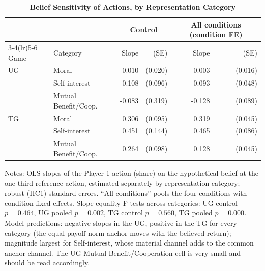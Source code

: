 \begin{table}[!htbp]
\centering
\small
\renewcommand{\arraystretch}{1.2}
\caption{\textbf{Belief Sensitivity of Actions, by Representation Category}}
\label{tab:belief_sensitivity}
\begin{tabular}{ll rr rr}
\toprule
 & & \multicolumn{2}{c}{Control} & \multicolumn{2}{c}{All conditions (condition FE)} \\
\cmidrule(lr){3-4}\cmidrule(lr){5-6}
Game & Category & Slope & (SE) & Slope & (SE) \\
\midrule
UG & Moral & 0.010 & (0.020) & -0.003 & (0.016) \\
 & Self-interest & -0.108 & (0.096) & -0.093 & (0.048) \\
 & Mutual Benefit/Coop. & -0.083 & (0.319) & -0.128 & (0.089) \\
\midrule
TG & Moral & 0.306 & (0.095) & 0.319 & (0.045) \\
 & Self-interest & 0.451 & (0.144) & 0.465 & (0.086) \\
 & Mutual Benefit/Coop. & 0.264 & (0.098) & 0.128 & (0.045) \\
\bottomrule
\end{tabular}
\begin{flushleft}
\footnotesize Notes: OLS slopes of the Player 1 action (share) on the hypothetical belief at the one-third reference action, estimated separately by representation category; robust (HC1) standard errors. ``All conditions'' pools the four conditions with condition fixed effects. Slope-equality F-tests across categories: UG control $p=0.464$, UG pooled $p=0.002$, TG control $p=0.560$, TG pooled $p=0.000$. Model predictions: negative slopes in the UG, positive in the TG for every category (the equal-payoff norm anchor moves with the believed return); magnitude largest for Self-interest, whose material channel adds to the common anchor channel. The UG Mutual Benefit/Cooperation cell is very small and should be read accordingly.
\end{flushleft}
\end{table}
